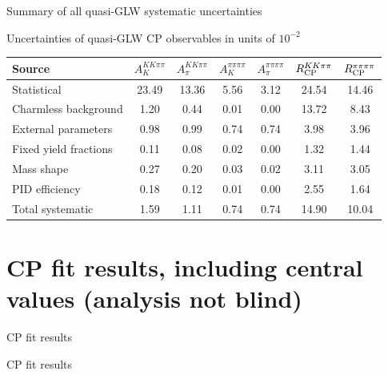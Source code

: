 \documentclass{beamer}
\begin{document}
\begin{frame}{Summary of all quasi-GLW systematic uncertainties}
  \begin{center}
    Uncertainties of quasi-GLW CP observables in units of $10^{-2}$
  \end{center}
  \footnotesize
  \vspace{0.02cm}
  \begin{center}
    \begin{tabular}{lcccccc} 
      \hline
      Source & $A_K^{KK\pi\pi}$ & $A_\pi^{KK\pi\pi}$ & $A_K^{\pi\pi\pi\pi}$ & $A_\pi^{\pi\pi\pi\pi}$ & $R_{\rm CP}^{KK\pi\pi}$ & $R_{\rm CP}^{\pi\pi\pi\pi}$ \\
      \hline
      Statistical                                   & 23.49 & 13.36 &  5.56 &  3.12 & 24.54 & 14.46 \\
      \hline
      Charmless background                          &  1.20 &  0.44 &  0.01 &  0.00 & 13.72 &  8.43 \\
      External parameters                           &  0.98 &  0.99 &  0.74 &  0.74 &  3.98 &  3.96 \\
      Fixed yield fractions                         &  0.11 &  0.08 &  0.02 &  0.00 &  1.32 &  1.44 \\
      Mass shape                                    &  0.27 &  0.20 &  0.03 &  0.02 &  3.11 &  3.05 \\
      PID efficiency                                &  0.18 &  0.12 &  0.01 &  0.00 &  2.55 &  1.64 \\
      \hline
      Total systematic                              &  1.59 &  1.11 &  0.74 &  0.74 & 14.90 & 10.04 \\
      \hline
    \end{tabular}
  \end{center}
\end{frame}

\section{CP fit results, including central values (analysis not blind)}
\begin{frame}{CP fit results}
  \begin{center}
    {\huge CP fit results}
  \end{center}
\end{frame}
\end{document}
